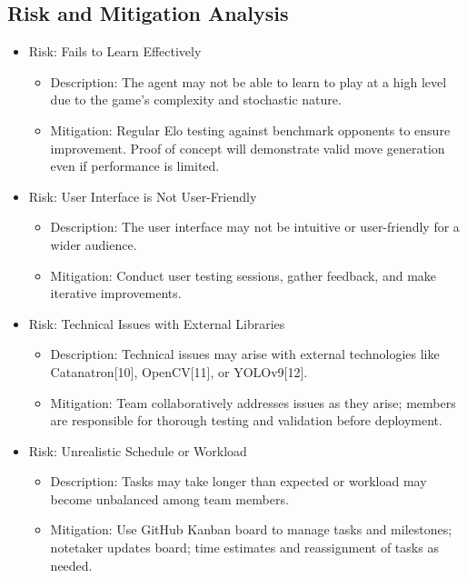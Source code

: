 \documentclass{article}
\begin{document}
\subsection{Risk and Mitigation Analysis}\label{subsec:risk}
\begin{itemize}
    \item {Risk: \AI{} Fails to Learn Effectively}
    \begin{itemize}
        \item Description: The \AI{} agent may not be able to learn to play \emph{\Catan{}} at a high level due to the game's complexity and stochastic nature.
        \item Mitigation: Regular Elo testing against benchmark opponents to ensure improvement. Proof of concept will demonstrate valid move generation even if performance is limited.
    \end{itemize}

    \item {Risk: User Interface is Not User-Friendly}
    \begin{itemize}
        \item Description: The user interface may not be intuitive or user-friendly for a wider audience.
        \item Mitigation: Conduct user testing sessions, gather feedback, and make iterative improvements.
    \end{itemize}

    \item {Risk: Technical Issues with External Libraries}
    \begin{itemize}
        \item Description: Technical issues may arise with external technologies like Catanatron[10], OpenCV[11], or YOLOv9[12].
        \item Mitigation: Team collaboratively addresses issues as they arise; members are responsible for thorough testing and validation before deployment.
    \end{itemize}

    \item {Risk: Unrealistic Schedule or Workload}
    \begin{itemize}
        \item Description: Tasks may take longer than expected or workload may become unbalanced among team members.
        \item Mitigation: Use GitHub Kanban board to manage tasks and milestones; notetaker updates board; time estimates and reassignment of tasks as needed.
    \end{itemize}
\end{itemize}
\end{document}
